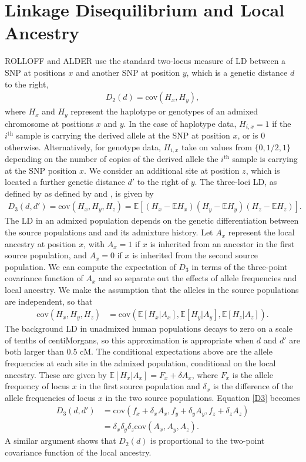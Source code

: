 \section{Linkage Disequilibrium and Local Ancestry}
ROLLOFF and ALDER use the standard two-locus measure of LD between a SNP at positions $x$ and another SNP at position $y$, which is a genetic distance $d$ to the right, 
\begin{align}
D_2(d) = \text{cov}(H_x,H_y),
\label{D2}
\end{align}
where $H_x$ and $H_y$ represent the haplotype or genotypes of an admixed chromosome at positions $x$ and $y$. In the case of haplotype data, $H_{i,x}=1$ if the $i^\text{th}$ sample is carrying the derived allele at the SNP at position $x$, or is 0 otherwise. Alternatively, for genotype data, $H_{i,x}$ take on values from $\{0,1/2,1\}$ depending on the number of copies of the derived allele the $i^\text{th}$ sample is carrying at the SNP position $x$. 
We consider an additional site at position $z$, which is located a further genetic distance $d'$ to the right of $y$. The three-loci LD, as defined by as defined by \cite{bennett1952theory} and \cite{slatkin1972treating}, is given by
\begin{align}
	D_3(d,d')
	= \text{cov}(H_x,H_y,H_z)
	= \mathbb{E}[(H_x-\mathbb{E}H_x)(H_y-\mathbb{E}H_y)(H_z-\mathbb{E}H_z)].
\label{D3}
\end{align}
The LD in an admixed population depends on the genetic differentiation between the source populations and and its admixture history. Let $A_x$ represent the local ancestry at position $x$, with $A_x=1$ if $x$ is inherited from an ancestor in the first source population, and $A_x=0$ if $x$ is inherited from the second source population. We can compute the expectation of $D_3$ in terms of the three-point covariance function of $A_x$ and so separate out the effects of allele frequencies and local ancestry. We make the assumption that the alleles in the source populations are independent, so that  
\begin{align*}
	\text{cov}\left(H_x,H_y,H_z\right)
		&= \text{cov}\left(\mathbb{E}[H_x|A_x],\mathbb{E}[H_y|A_y],\mathbb{E}[H_z|A_z]\right).
\end{align*}
The background LD in unadmixed human populations decays to zero on a scale of tenths of centiMorgans, so this approximation is appropriate when $d$ and $d'$ are both larger than 0.5 cM. The conditional expectations above are the allele frequencies at each site in the admixed population, conditional on the local ancestry. These are given by $\mathbb{E}[H_x|A_x] = F_x+\delta A_x$, where $F_x$ is the allele frequency of locus $x$ in the first source population and $\delta_x$ is the difference of the allele frequencies of locus $x$ in the two source populations. Equation \ref{D3} becomes 
\begin{align}
	D_3(d,d')
		&= \text{cov}\left(f_x+\delta_xA_x,f_y+\delta_yA_y,f_z+\delta_zA_z\right)\nonumber \\	
		&= \delta_x\delta_y\delta_z \text{cov}(A_x,A_y,A_z).
	\label{local_ancestry}
\end{align}
A similar argument shows that $D_2(d)$ is proportional to the two-point covariance function of the local ancestry.

